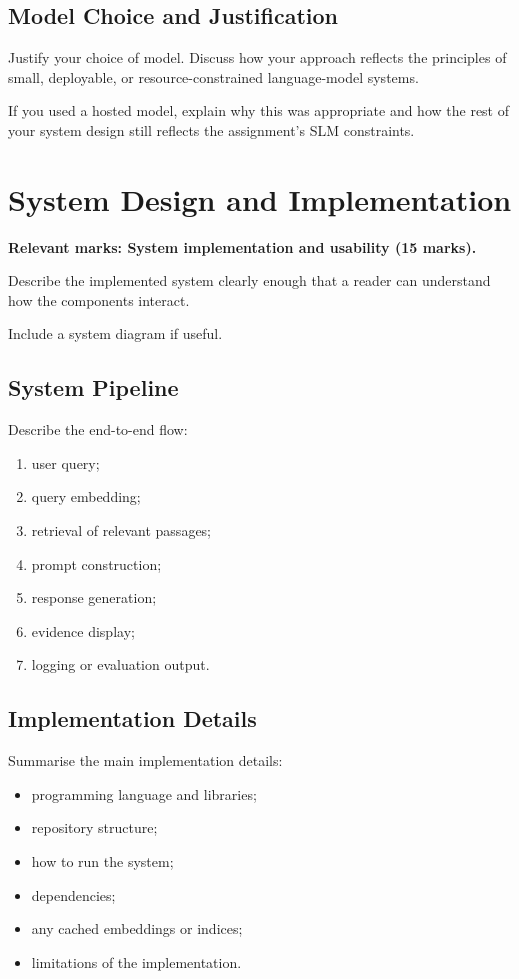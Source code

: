 \documentclass[10pt,conference]{IEEEtran}
\begin{document}
\subsection{Model Choice and Justification}

Justify your choice of model. 
Discuss how your approach reflects the principles of small, deployable, or resource-constrained language-model systems.

If you used a hosted model, explain why this was appropriate and how the rest of your system design still reflects the assignment's SLM constraints.

\section{System Design and Implementation}
\label{sec:system}

\textbf{Relevant marks: System implementation and usability (15 marks).}

Describe the implemented system clearly enough that a reader can understand how the components interact.

Include a system diagram if useful.

\subsection{System Pipeline}

Describe the end-to-end flow:

\begin{enumerate}
    \item user query;
    \item query embedding;
    \item retrieval of relevant passages;
    \item prompt construction;
    \item response generation;
    \item evidence display;
    \item logging or evaluation output.
\end{enumerate}

\subsection{Implementation Details}

Summarise the main implementation details:

\begin{itemize}
    \item programming language and libraries;
    \item repository structure;
    \item how to run the system;
    \item dependencies;
    \item any cached embeddings or indices;
    \item limitations of the implementation.
\end{itemize}
\end{document}
